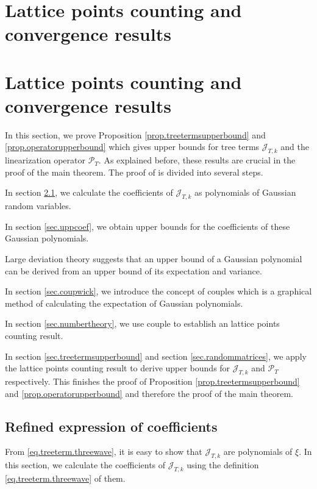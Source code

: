 \section{Lattice points counting and convergence results}

\section{Lattice points counting and convergence results}
In this section, we prove Proposition \ref{prop.treetermsupperbound} and \ref{prop.operatorupperbound} which gives upper bounds for tree terms $\mathcal{J}_{T,k}$ and the linearization operator $\mathcal{P}_T$. As explained before, these results are crucial in the proof of the main theorem. The proof of is divided into several steps.

In section \ref{sec.refexp}, we calculate the coefficients of $\mathcal{J}_{T,k}$ as polynomials of Gaussian random variables.

In section \ref{sec.uppcoef}, we obtain upper bounds for the coefficients of these Gaussian polynomials.

Large deviation theory suggests that an upper bound of a Gaussian polynomial can be derived from an upper bound of its expectation and variance.

In section \ref{sec.coupwick}, we introduce the concept of couples which is a graphical method of calculating the expectation of Gaussian polynomials.

In section \ref{sec.numbertheory}, we use couple to establish an lattice points counting result.

In section \ref{sec.treetermsupperbound} and section \ref{sec.randommatrices}, we apply the lattice points counting result to derive upper bounds for  $\mathcal{J}_{T,k}$ and $\mathcal{P}_T$ respectively. This finishes the proof of Proposition \ref{prop.treetermsupperbound} and \ref{prop.operatorupperbound} and therefore the proof of the main theorem.


\subsection{Refined expression of coefficients}\label{sec.refexp} From \eqref{eq.treeterm.threewave}, it is easy to show that $\mathcal{J}_{T,k}$ are polynomials of $\xi$. In this section, we calculate the coefficients of $\mathcal{J}_{T,k}$ using the definition \eqref{eq.treeterm.threewave} of them.

